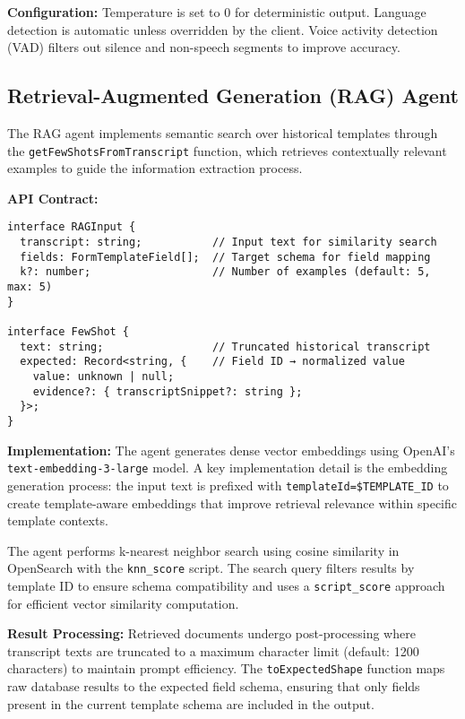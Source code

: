 \textbf{Configuration:} Temperature is set to 0 for deterministic output. Language detection is automatic unless overridden by the client. Voice activity detection (VAD) filters out silence and non-speech segments to improve accuracy.
\subsection{Retrieval-Augmented Generation (RAG) Agent}
\label{subsec:impl-rag}

The RAG agent implements semantic search over historical templates through the \texttt{getFewShotsFromTranscript} function, which retrieves contextually relevant examples to guide the information extraction process.

\textbf{API Contract:}
\begin{verbatim}
interface RAGInput {
  transcript: string;           // Input text for similarity search
  fields: FormTemplateField[];  // Target schema for field mapping
  k?: number;                   // Number of examples (default: 5, max: 5)
}

interface FewShot {
  text: string;                 // Truncated historical transcript
  expected: Record<string, {    // Field ID → normalized value
    value: unknown | null;
    evidence?: { transcriptSnippet?: string };
  }>;
}
\end{verbatim}

\textbf{Implementation:} The agent generates dense vector embeddings using OpenAI's \texttt{text-embedding-3-large} model. A key implementation detail is the embedding generation process: the input text is prefixed with \texttt{templateId=\${TEMPLATE\_ID}} to create template-aware embeddings that improve retrieval relevance within specific template contexts.

The agent performs k-nearest neighbor search using cosine similarity in OpenSearch with the \texttt{knn\_score} script. The search query filters results by template ID to ensure schema compatibility and uses a \texttt{script\_score} approach for efficient vector similarity computation.


\textbf{Result Processing:} Retrieved documents undergo post-processing where transcript texts are truncated to a maximum character limit (default: 1200 characters) to maintain prompt efficiency. The \texttt{toExpectedShape} function maps raw database results to the expected field schema, ensuring that only fields present in the current template schema are included in the output.

